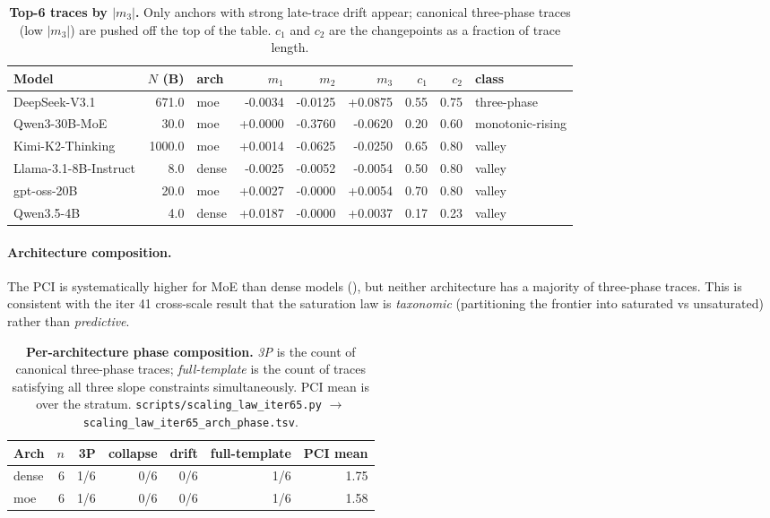 \begin{table}[t]
  \centering
  \small
  \begin{tabular}{lrlrrrrrl}
    \toprule
    Model & $N$ (B) & arch & $m_1$ & $m_2$ & $m_3$ & $c_1$ & $c_2$ & class \\
    \midrule
      DeepSeek-V3.1 & 671.0 & moe & -0.0034 & -0.0125 & +0.0875 & 0.55 & 0.75 & three-phase \\
      Qwen3-30B-MoE & 30.0 & moe & +0.0000 & -0.3760 & -0.0620 & 0.20 & 0.60 & monotonic-rising \\
      Kimi-K2-Thinking & 1000.0 & moe & +0.0014 & -0.0625 & -0.0250 & 0.65 & 0.80 & valley \\
      Llama-3.1-8B-Instruct & 8.0 & dense & -0.0025 & -0.0052 & -0.0054 & 0.50 & 0.80 & valley \\
      gpt-oss-20B & 20.0 & moe & +0.0027 & -0.0000 & +0.0054 & 0.70 & 0.80 & valley \\
      Qwen3.5-4B & 4.0 & dense & +0.0187 & -0.0000 & +0.0037 & 0.17 & 0.23 & valley \\
    \bottomrule
  \end{tabular}
  \caption{\textbf{Top-6 traces by $|m_3|$.}  Only anchors with
    strong late-trace drift appear; canonical three-phase traces
    (low $|m_3|$) are pushed off the top of the table.  $c_1$ and
    $c_2$ are the changepoints as a fraction of trace length.}
  \label{tab:iter65-top-slopes}
\end{table}

\paragraph{Architecture composition.}
The PCI is systematically higher for MoE than dense models
(), but neither architecture has a
majority of three-phase traces.  This is consistent with the
iter 41 cross-scale result that the saturation law is
\emph{taxonomic} (partitioning the frontier into saturated vs
unsaturated) rather than \emph{predictive}.

\begin{table}[t]
  \centering
  \small
  \begin{tabular}{lrrrrrr}
    \toprule
    Arch & $n$ & 3P & collapse & drift & full-template & PCI mean \\
    \midrule
      dense & 6 & 1/6 & 0/6 & 0/6 & 1/6 & 1.75 \\
      moe & 6 & 1/6 & 0/6 & 0/6 & 1/6 & 1.58 \\
    \bottomrule
  \end{tabular}
  \caption{\textbf{Per-architecture phase composition.}
    \emph{3P} is the count of canonical three-phase traces;
    \emph{full-template} is the count of traces satisfying all
    three slope constraints simultaneously.  PCI mean is over
    the stratum.  \texttt{scripts/scaling\_law\_iter65.py}
    $\to$ \texttt{scaling\_law\_iter65\_arch\_phase.tsv}.}
  \label{tab:iter65-arch}
\end{table}

